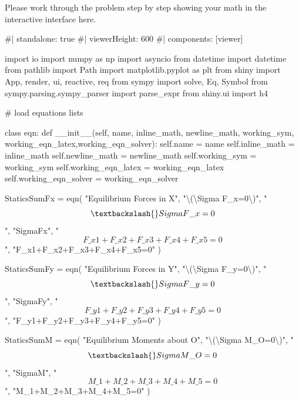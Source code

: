 \documentclass[
  letterpaper,
  DIV=11,
  numbers=noendperiod]{scrreprt}
\newenvironment{Shaded}{\begin{snugshade}}{\end{snugshade}}
\newcommand{\NormalTok}[1]{\textcolor[rgb]{0.00,0.23,0.31}{#1}}
\begin{document}
Please work through the problem step by step showing your math in the
interactive interface here.

\begin{Shaded}
\begin{Highlighting}[]
\NormalTok{\#| standalone: true}
\NormalTok{\#| viewerHeight: 600}
\NormalTok{\#| components: [viewer]}



\NormalTok{import io}
\NormalTok{import numpy as np}
\NormalTok{import asyncio}
\NormalTok{from datetime import datetime}
\NormalTok{from pathlib import Path}
\NormalTok{import matplotlib.pyplot as plt}
\NormalTok{from shiny import App, render, ui, reactive, req}
\NormalTok{from sympy import solve, Eq, Symbol}
\NormalTok{from sympy.parsing.sympy\_parser import parse\_expr}
\NormalTok{from shiny.ui import h4}

\NormalTok{\# load equations lists}


\NormalTok{class eqn:}
\NormalTok{    def \_\_init\_\_(self, name, inline\_math, newline\_math, working\_sym, working\_eqn\_latex,working\_eqn\_solver):}
\NormalTok{        self.name = name}
\NormalTok{        self.inline\_math = inline\_math}
\NormalTok{        self.newline\_math = newline\_math}
\NormalTok{        self.working\_sym = working\_sym}
\NormalTok{        self.working\_eqn\_latex = working\_eqn\_latex}
\NormalTok{        self.working\_eqn\_solver = working\_eqn\_solver}

\NormalTok{StaticsSumFx = eqn(}
\NormalTok{    "Equilibrium Forces in X", }
\NormalTok{    "\textbackslash{}(\textbackslash{}Sigma F\_x=0\textbackslash{})", }
\NormalTok{    "$$\textbackslash{}Sigma F\_x=0$$", }
\NormalTok{    "SigmaFx",}
\NormalTok{    "$$F\_x1+F\_x2+F\_x3+F\_x4+F\_x5=0$$",}
\NormalTok{    "F\_x1+F\_x2+F\_x3+F\_x4+F\_x5=0"}
\NormalTok{)}

\NormalTok{StaticsSumFy = eqn(}
\NormalTok{    "Equilibrium Forces in Y", }
\NormalTok{    "\textbackslash{}(\textbackslash{}Sigma F\_y=0\textbackslash{})", }
\NormalTok{    "$$\textbackslash{}Sigma F\_y=0$$", }
\NormalTok{    "SigmaFy",}
\NormalTok{    "$$F\_y1+F\_y2+F\_y3+F\_y4+F\_y5=0$$",}
\NormalTok{    "F\_y1+F\_y2+F\_y3+F\_y4+F\_y5=0"}
\NormalTok{)}

\NormalTok{StaticsSumM = eqn(}
\NormalTok{    "Equilibrium Moments about O", }
\NormalTok{    "\textbackslash{}(\textbackslash{}Sigma M\_O=0\textbackslash{})", }
\NormalTok{    "$$\textbackslash{}Sigma M\_O=0$$", }
\NormalTok{    "SigmaM",}
\NormalTok{    "$$M\_1+M\_2+M\_3+M\_4+M\_5=0$$",}
\NormalTok{    "M\_1+M\_2+M\_3+M\_4+M\_5=0"}
\NormalTok{)}


\end{Highlighting}
\end{Shaded}
\end{document}
